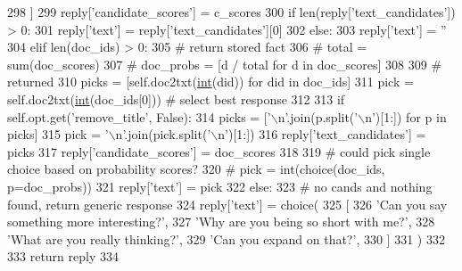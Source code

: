 \begin{DoxyCode}
298                 ]
299                 reply[\textcolor{stringliteral}{'candidate\_scores'}] = c\_scores
300                 \textcolor{keywordflow}{if} len(reply[\textcolor{stringliteral}{'text\_candidates'}]) > 0:
301                     reply[\textcolor{stringliteral}{'text'}] = reply[\textcolor{stringliteral}{'text\_candidates'}][0]
302                 \textcolor{keywordflow}{else}:
303                     reply[\textcolor{stringliteral}{'text'}] = \textcolor{stringliteral}{''}
304             \textcolor{keywordflow}{elif} len(doc\_ids) > 0:
305                 \textcolor{comment}{# return stored fact}
306                 \textcolor{comment}{# total = sum(doc\_scores)}
307                 \textcolor{comment}{# doc\_probs = [d / total for d in doc\_scores]}
308 
309                 \textcolor{comment}{# returned}
310                 picks = [self.doc2txt(\hyperlink{namespacelanguage__model_1_1eval__ppl_a7d12ee00479673c5c8d1f6d01faa272a}{int}(did)) \textcolor{keywordflow}{for} did \textcolor{keywordflow}{in} doc\_ids]
311                 pick = self.doc2txt(\hyperlink{namespacelanguage__model_1_1eval__ppl_a7d12ee00479673c5c8d1f6d01faa272a}{int}(doc\_ids[0]))  \textcolor{comment}{# select best response}
312 
313                 \textcolor{keywordflow}{if} self.opt.get(\textcolor{stringliteral}{'remove\_title'}, \textcolor{keyword}{False}):
314                     picks = [\textcolor{stringliteral}{'\(\backslash\)n'}.join(p.split(\textcolor{stringliteral}{'\(\backslash\)n'})[1:]) \textcolor{keywordflow}{for} p \textcolor{keywordflow}{in} picks]
315                     pick = \textcolor{stringliteral}{'\(\backslash\)n'}.join(pick.split(\textcolor{stringliteral}{'\(\backslash\)n'})[1:])
316                 reply[\textcolor{stringliteral}{'text\_candidates'}] = picks
317                 reply[\textcolor{stringliteral}{'candidate\_scores'}] = doc\_scores
318 
319                 \textcolor{comment}{# could pick single choice based on probability scores?}
320                 \textcolor{comment}{# pick = int(choice(doc\_ids, p=doc\_probs))}
321                 reply[\textcolor{stringliteral}{'text'}] = pick
322             \textcolor{keywordflow}{else}:
323                 \textcolor{comment}{# no cands and nothing found, return generic response}
324                 reply[\textcolor{stringliteral}{'text'}] = choice(
325                     [
326                         \textcolor{stringliteral}{'Can you say something more interesting?'},
327                         \textcolor{stringliteral}{'Why are you being so short with me?'},
328                         \textcolor{stringliteral}{'What are you really thinking?'},
329                         \textcolor{stringliteral}{'Can you expand on that?'},
330                     ]
331                 )
332 
333         \textcolor{keywordflow}{return} reply
334 \end{DoxyCode}
